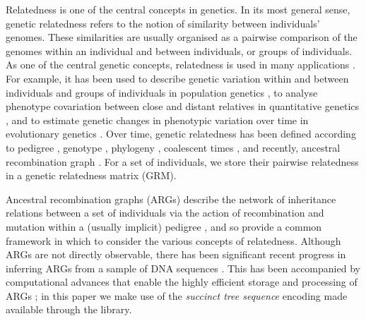 

Relatedness is one of the central concepts in genetics.
%
In its most general sense, genetic relatedness refers to the notion of
similarity between individuals' genomes.
%
These similarities are usually organised as a pairwise comparison of the
genomes within an individual and between individuals, or groups of
individuals.
%
As one of the central genetic concepts, relatedness is used in many
applications \citep{weir2006genetic, speed2015relatedness}.
%
For example, it has been used to describe genetic variation within and between individuals
and groups of individuals in population genetics
\citep{crow2009introduction, charlesworth2010elements},
to analyse phenotype covariation between close and distant relatives in
quantitative genetics \citep{falconer1996introduction, lynch1998genetics},
and to estimate genetic changes in phenotypic variation over time in
evolutionary genetics \citep{walsh2018evolution, arnold2023evolutionary}.
%
Over time, genetic relatedness has been defined according to
pedigree \citep{fisher1919correlation, wright1922coefficients},
genotype \citep{cotterman1940calculus, malecot1948mathematiques, malecot1969mathemathics},
phylogeny \citep{felsenstein1985phylogenies,lynch1991methods},
coalescent times \citep{slatkin1991inbreeding}, and
recently, ancestral recombination graph \citep{tsambos2022efficient, fan2022genealogical, zhang2023biobank}.
%
%
For a set of individuals, we store their pairwise relatedness in a genetic relatedness matrix (GRM).
    
Ancestral recombination graphs (ARGs) 
describe the network of inheritance relations between a set of individuals
via the action of recombination and mutation within a (usually implicit) pedigree
\citep{brandt2024promise, lewanski2024era, wong2023general, nielsen2024inference},
and so provide a common framework in which to consider
the various concepts of relatedness.
%
Although ARGs are not directly observable,
there has been significant recent progress in inferring ARGs from a sample of DNA sequences
\citep{speidel2019method, kelleher2019inferring, zhang2023biobank, deng2024robust, gunnarsson2024scalable}.
%
This has been accompanied by computational advances that enable
the highly efficient storage and processing of ARGs
\citep{kelleher2016efficient, zhu2024variance, dehaas2024enabling};
in this paper we make use of the \textit{succinct tree sequence} encoding
\citep{ralph2020efficiently, wong2023general}
made available through the \tskit{} library.

